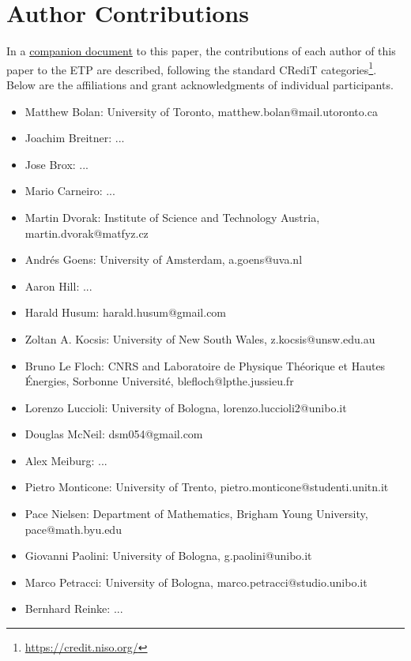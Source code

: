 \section{Author Contributions}

In a \href{https://github.com/teorth/equational_theories/blob/main/paper/contributions.md}{companion document} to this paper, the contributions of each author of this paper to the ETP are described, following the standard CRediT categories\footnote{\url{https://credit.niso.org/}}.  Below are the affiliations and grant acknowledgments of individual participants.  


\begin{itemize}
    \item Matthew Bolan: University of Toronto, matthew.bolan@mail.utoronto.ca
    \item Joachim Breitner: ...
    \item Jose Brox: ...
    \item Mario Carneiro: ...
    \item Martin Dvorak: Institute of Science and Technology Austria, martin.dvorak@matfyz.cz
    \item Andr\'es Goens: University of Amsterdam, a.goens@uva.nl
    \item Aaron Hill: ...
    \item Harald Husum: harald.husum@gmail.com
    \item Zoltan A. Kocsis: University of New South Wales, z.kocsis@unsw.edu.au
    \item Bruno Le Floch: CNRS and Laboratoire de Physique Th\'eorique et Hautes \'Energies, Sorbonne Universit\'e, blefloch@lpthe.jussieu.fr
    \item Lorenzo Luccioli: University of Bologna, lorenzo.luccioli2@unibo.it
    \item Douglas McNeil: dsm054@gmail.com
    \item Alex Meiburg: ...
    \item Pietro Monticone: University of Trento, pietro.monticone@studenti.unitn.it
    \item Pace Nielsen: Department of Mathematics, Brigham Young University, pace@math.byu.edu
    \item Giovanni Paolini: University of Bologna, g.paolini@unibo.it
    \item Marco Petracci: University of Bologna, marco.petracci@studio.unibo.it
    \item Bernhard Reinke: ...

\end{itemize}
